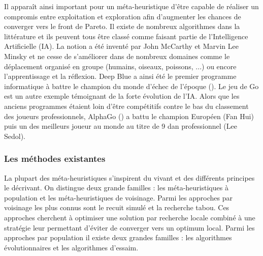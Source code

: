 Il apparaît ainsi important pour un méta-heuristique d’être capable de réaliser
un compromis entre exploitation et exploration afin d’augmenter les chances de
converger vers le front de Pareto. Il existe de nombreux algorithmes dans la littérature
et ils peuvent tous être classé comme faisant partie de l’Intelligence Artificielle (IA).
La notion a été inventé par John McCarthy et Marvin Lee Minsky et ne cesse de s’améliorer
dans de nombreux domaines comme le déplacement organisé en groupe (humains, oiseaux, poissons, ...)
ou encore l’apprentissage et la réflexion. Deep Blue a ainsi été le premier programme
informatique à battre le champion du monde d’échec de l’époque (\cite{Hsu199970}).
Le jeu de Go est un autre exemple témoignant de la forte évolution de l’IA. Alors que
les anciens programmes étaient loin d’être compétitifs contre le bas du classement
des joueurs professionnels, AlphaGo (\cite{Silver2016484}) a battu le champion Européen (Fan Hui)
puis un des meilleurs joueur au monde au titre de 9 dan professionnel (Lee Sedol).


\subsubsection{Les méthodes existantes} %
\label{ssub:les_methodes_existantes}
La plupart des méta-heuristiques s’inspirent du vivant et des différents principes
le décrivant. On distingue deux grande familles : les méta-heuristiques à population
et les méta-heuristiques de voisinage. Parmi les approches par voisinage les plus
connus sont le recuit simulé et la recherche tabou. Ces approches cherchent à optimiser
une solution par recherche locale combiné à une stratégie leur permettant d’éviter
de converger vers un optimum local. Parmi les approches par population il existe
deux grandes familles : les algorithmes évolutionnaires et les algorithmes d’essaim.

